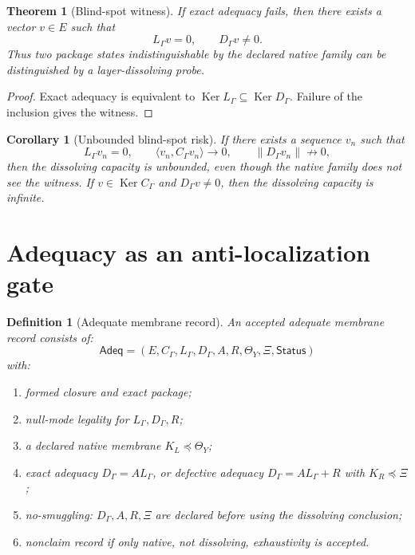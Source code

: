 \documentclass[11pt]{article}
\newtheorem{theorem}{Theorem}
\newtheorem{definition}{Definition}
\newtheorem{corollary}{Corollary}
\newcommand{\Ker}{\operatorname{Ker}}
\begin{document}
\begin{theorem}[Blind-spot witness]
If exact adequacy fails, then there exists a vector \(v\in E\) such that
\[
        L_\Gamma v=0,\qquad D_\Gamma v\ne0.
\]
Thus two package states indistinguishable by the declared native family can be
distinguished by a layer-dissolving probe.
\end{theorem}

\begin{proof}
Exact adequacy is equivalent to \(\Ker L_\Gamma\subseteq\Ker D_\Gamma\).
Failure of the inclusion gives the witness.
\end{proof}

\begin{corollary}[Unbounded blind-spot risk]
If there exists a sequence \(v_n\) such that
\[
        L_\Gamma v_n=0,\qquad
        \langle v_n,C_\Gamma v_n\rangle\to0,\qquad
        \|D_\Gamma v_n\|\not\to0,
\]
then the dissolving capacity is unbounded, even though the native family does
not see the witness.  If \(v\in\Ker C_\Gamma\) and \(D_\Gamma v\ne0\), then
the dissolving capacity is infinite.
\end{corollary}

\section{Adequacy as an anti-localization gate}

\begin{definition}[Adequate membrane record]
An accepted adequate membrane record consists of:
\[
\mathsf{Adeq}=(E,C_\Gamma,L_\Gamma,D_\Gamma,A,R,\Theta_Y,\Xi,\mathsf{Status})
\]
with:
\begin{enumerate}[label=(\alph*)]
\item formed closure and exact package;
\item null-mode legality for \(L_\Gamma,D_\Gamma,R\);
\item a declared native membrane \(K_L\preceq\Theta_Y\);
\item exact adequacy \(D_\Gamma=AL_\Gamma\), or defective adequacy
      \(D_\Gamma=AL_\Gamma+R\) with \(K_R\preceq\Xi\);
\item no-smuggling: \(D_\Gamma,A,R,\Xi\) are declared before using the
      dissolving conclusion;
\item nonclaim record if only native, not dissolving, exhaustivity is accepted.
\end{enumerate}
\end{definition}
\end{document}

